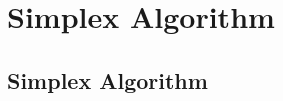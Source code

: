 \documentclass[../maths.tex]{subfiles}
\begin{document}
\chapter{Simplex Algorithm}
\section{Simplex Algorithm}
\end{document}
